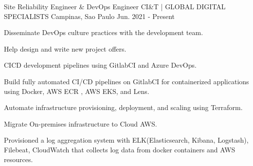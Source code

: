 

\begin{cventries}

  \cventry
    {Site Reliability Engineer \& DevOps Engineer} %
    {CI\&T | GLOBAL DIGITAL SPECIALISTS} %
    {Campinas, Sao Paulo} %
    {Jun. 2021 - Present} %
    {
      \begin{cvitems} %
        \item {Disseminate DevOps culture practices with the development team.}
        \item {Help design and write new project offers.}
        \item {CICD development pipelines using GitlabCI and Azure DevOps.}
        \item {Build fully automated CI/CD pipelines on GitlabCI for containerized applications using Docker, AWS ECR , AWS EKS, and Lens.}
        \item {Automate infrastructure provisioning, deployment, and scaling using Terraform.}
        \item {Migrate On-premises infrastructure to Cloud AWS.}
        \item {Provisioned a log aggregation system with ELK(Elasticsearch, Kibana, Logstash), Filebeat, CloudWatch that collects log data from docker containers and AWS resources.}
      \end{cvitems}
    }
\break


\end{cventries}
